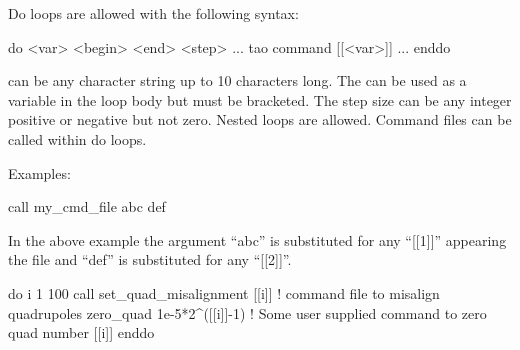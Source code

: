 Do loops are allowed with the following syntax:
\begin{example}
  do <var> <begin> <end> <step> 
    ...
    tao command [[<var>]]
    ...
  enddo
\end{example}
 can be any character string up to 10 characters long.
The  can be used as a variable in the loop body but must be
bracketed.  The step size can be any integer positive or negative but not zero.
Nested loops are allowed. Command files can be called within do loops.

Examples:
\begin{example}
    call my_cmd_file abc def 
\end{example}
In the above example the argument ``abc'' is substituted for any
``[[1]]'' appearing the file and ``def'' is substituted for any
``[[2]]''.
\Newline

\begin{example}
  do i 1 100
    call set_quad_misalignment [[i]] ! command file to misalign quadrupoles
    zero_quad 1e-5*2^([[i]]-1) ! Some user supplied command to zero quad number [[i]]
  enddo
\end{example}

